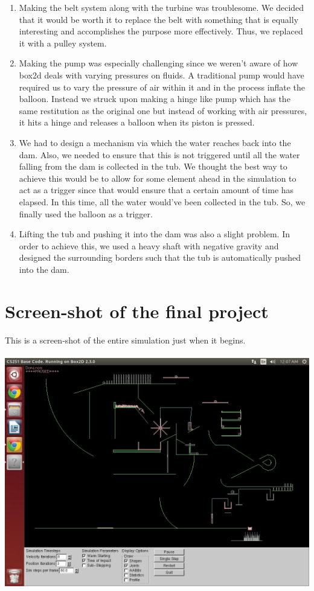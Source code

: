 \documentclass{report}
\begin{document}
\begin{enumerate}
\item Making the belt system along with the turbine was troublesome. We decided that it would be worth it to replace the belt with something that is equally interesting and accomplishes the purpose more effectively. Thus, we replaced it with a pulley system.
\item Making the pump was especially challenging since we weren't aware of how box2d deals with varying pressures on fluids. A traditional pump would have required us to vary the pressure of air within it and in the process inflate the balloon. Instead we struck upon making a hinge like pump which has the same restitution as the original one but instead of working with air pressures, it hits a hinge and releases a balloon when its piston is pressed.
\item We had to design a mechanism via which the water reaches back into the dam. Also, we needed to ensure that this is not triggered until all the water falling from the dam is collected in the tub. We thought the best way to achieve this would be to allow for some element ahead in the simulation to act as a trigger since that would ensure that a certain amount of time has elapsed. In this time, all the water would've been collected in the tub. So, we finally used the balloon as a trigger.
\item Lifting the tub and pushing it into the dam was also a slight problem. In order to achieve this, we used a heavy shaft with negative gravity and designed the surrounding borders such that the tub is automatically pushed into the dam.
\end{enumerate}

\section{Screen-shot of the final project}
This is a screen-shot of the entire simulation just when it begins.\\\\
\includegraphics[scale=0.4]{FullProject}\\
\pagebreak
\end{document}
